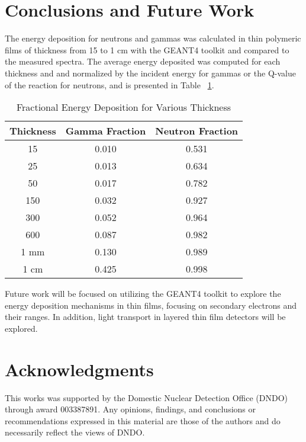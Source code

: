 \documentclass[draftcls,onecolumn]{IEEEtran}
\begin{document}
\section{Conclusions and Future Work}
\label{sec:Conclusions}
The energy deposition for neutrons and gammas was calculated in thin polymeric films of thickness from 15 \micron to 1 cm with the GEANT4 toolkit and compared to the measured spectra.
The average energy deposited was computed for each thickness and and normalized by the incident energy for gammas or the Q-value of the reaction for neutrons, and is presented in Table ~\ref{tab:FractionEDep}.
\begin{table}[!htb]
    \caption{Fractional Energy Deposition for Various Thickness}
	\centering
	\begin{tabular}{c | c c}
	Thickness & Gamma Fraction & Neutron Fraction \\
	\hline
	\hline
	15 \micron & 0.010 & 0.531 \\
	25 \micron & 0.013 & 0.634 \\
	50 \micron & 0.017 & 0.782 \\
	150 \micron & 0.032 & 0.927 \\
	300 \micron & 0.052 & 0.964 \\
	600 \micron & 0.087 & 0.982 \\
	1 mm & 0.130 & 0.989 \\
	1 cm & 0.425 & 0.998 \\
	\hline
	\end{tabular}
    \label{tab:FractionEDep}
\end{table}
Future work will be focused on utilizing the GEANT4 toolkit to explore the energy deposition mechanisms in thin films, focusing on secondary electrons and their ranges. 
In addition, light transport in layered thin film detectors will be explored.
\section{Acknowledgments}
This works was supported by the Domestic Nuclear Detection Office (DNDO) through award 003387891.
Any opinions, findings, and conclusions or recommendations expressed in this material are those of the authors and do necessarily reflect the views of DNDO.



\end{document}
